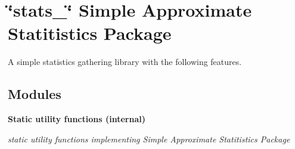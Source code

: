 \section{\char`\"{}stats\_\-\char`\"{} Simple Approximate Statitistics Package}
\label{group__stats}
A simple statistics gathering library with the following features. 
\subsection*{Modules}
\begin{CompactItemize}
\item 
{\bf Static utility functions (internal)}
\begin{CompactList}\small\item\em static utility functions implementing Simple Approximate Statitistics Package\item\end{CompactList}

\end{CompactItemize}
